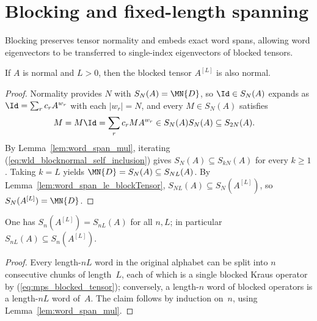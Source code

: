 \section{Blocking and fixed-length spanning}
\label{sec:app_wielandt_blocking_support}
\label{sec:rectangular_span}

Blocking preserves tensor normality and embeds exact word spans, allowing word
eigenvectors to be transferred to single-index eigenvectors of blocked tensors.

\begin{lemma}\label{thm:isNormal_blockTensor}
    \leanok
    If $A$ is normal and $L>0$, then the blocked tensor
    $A^{[L]}$ is also normal.
\end{lemma}

\begin{proof}\leanok
    Normality provides $N$ with $S_N(A)=\MN{D}$, so $\Id\in S_N(A)$ expands as
    $\Id=\sum_r c_rA^{w_r}$ with each $|w_r|=N$, and every $M\in S_N(A)$
    satisfies
    \begin{align}
        M
         & =M\Id
        =\sum_r c_rMA^{w_r}
        \in S_N(A)S_N(A)
        \subseteq S_{2N}(A).
        \label{eq:wld_blocknormal_self_inclusion}
    \end{align}
    By Lemma~\ref{lem:word_span_mul}, iterating
    (\ref{eq:wld_blocknormal_self_inclusion}) gives
    $S_N(A)\subseteq S_{kN}(A)$ for every $k\ge1$.
    Taking $k=L$ yields
    $\MN{D}=S_N(A)\subseteq S_{NL}(A)$.
    By Lemma~\ref{lem:word_span_le_blockTensor},
    $S_{NL}(A)\subseteq S_N(A^{[L]})$, so
    $S_N(A^{[L]})=\MN{D}$.
\end{proof}

\begin{lemma}%
    \label{lem:word_span_le_blockTensor}
    \leanok
    One has $S_n(A^{[L]})=S_{nL}(A)$ for all $n,L$; in particular
    $S_{nL}(A)\subseteq S_n(A^{[L]})$.
\end{lemma}

\begin{proof}\leanok
    Every length-$nL$ word in the original alphabet
    can be split into $n$ consecutive chunks of length~$L$,
    each of which is a single blocked Kraus operator by
    (\ref{eq:mps_blocked_tensor}); conversely, a length-$n$ word of blocked
    operators is a length-$nL$ word of~$A$.
    The claim follows by induction on~$n$, using
    Lemma~\ref{lem:word_span_mul}.
\end{proof}

